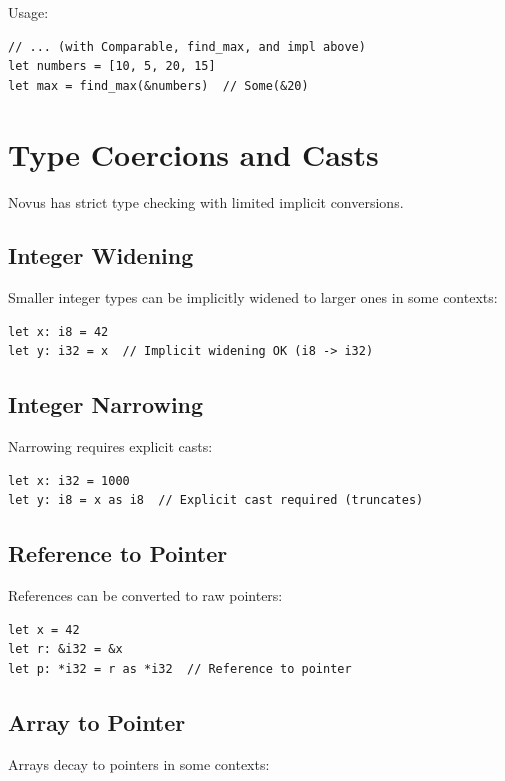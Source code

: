 Usage:

\begin{lstlisting}
// ... (with Comparable, find_max, and impl above)
let numbers = [10, 5, 20, 15]
let max = find_max(&numbers)  // Some(&20)
\end{lstlisting}

\section{Type Coercions and Casts}

Novus has strict type checking with limited implicit conversions.

\subsection{Integer Widening}

Smaller integer types can be implicitly widened to larger ones in some contexts:

\begin{lstlisting}
let x: i8 = 42
let y: i32 = x  // Implicit widening OK (i8 -> i32)
\end{lstlisting}

\subsection{Integer Narrowing}

Narrowing requires explicit casts:

\begin{lstlisting}
let x: i32 = 1000
let y: i8 = x as i8  // Explicit cast required (truncates)
\end{lstlisting}

\subsection{Reference to Pointer}

References can be converted to raw pointers:

\begin{lstlisting}
let x = 42
let r: &i32 = &x
let p: *i32 = r as *i32  // Reference to pointer
\end{lstlisting}

\subsection{Array to Pointer}

Arrays decay to pointers in some contexts:

